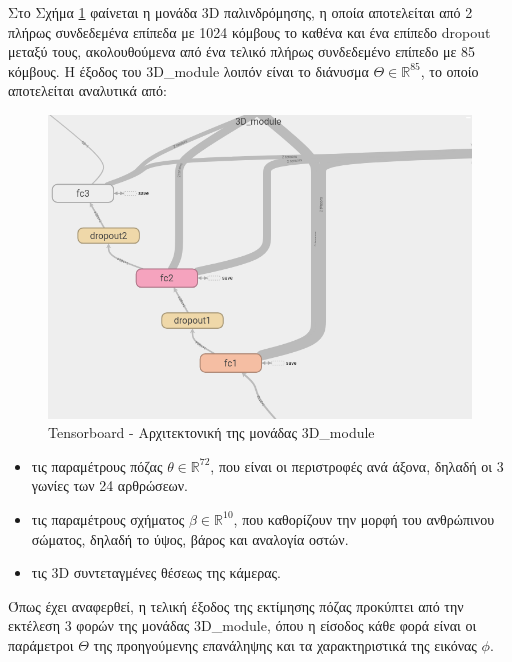 Στο Σχήμα \ref{fig:3d_module} φαίνεται η μονάδα 3D παλινδρόμησης, η οποία αποτελείται από 2 πλήρως συνδεδεμένα επίπεδα με 1024 κόμβους το καθένα και ένα επίπεδο dropout μεταξύ τους, ακολουθούμενα από ένα τελικό πλήρως συνδεδεμένο επίπεδο με 85 κόμβους. Η έξοδος του 3D\_module λοιπόν είναι το διάνυσμα $\Theta \in \mathbb{R}^{85}$, το οποίο αποτελείται αναλυτικά από: 

\begin{figure}[H]
	\centering
	\includegraphics[scale=0.5]{images/chapter3/3d_module.png}
	\caption{Tensorboard - Αρχιτεκτονική της μονάδας 3D\_module}
	\label{fig:3d_module}
\end{figure}

\begin{itemize}
	\item τις παραμέτρους πόζας $\theta \in \mathbb{R}^{72}$, που είναι οι περιστροφές ανά άξονα, δηλαδή οι 3 γωνίες των 24 αρθρώσεων.
	\item τις παραμέτρους σχήματος $\beta \in \mathbb{R}^{10}$, που καθορίζουν την μορφή του ανθρώπινου σώματος, δηλαδή το ύψος, βάρος και αναλογία οστών.
	\item τις 3D συντεταγμένες θέσεως της κάμερας.
\end{itemize}

Όπως έχει αναφερθεί, η τελική έξοδος της εκτίμησης πόζας προκύπτει από την εκτέλεση 3 φορών της μονάδας 3D\_module, όπου η είσοδος κάθε φορά είναι οι παράμετροι $\Theta$ της προηγούμενης επανάληψης και τα χαρακτηριστικά της εικόνας $\phi$.